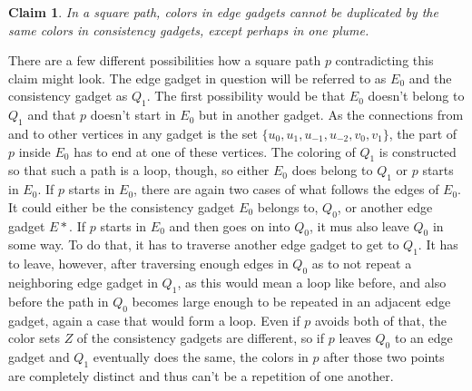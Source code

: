 \documentclass[12pt,a4paper]{article}
\newtheorem{claim}{Claim}
\begin{document}
\begin{claim}
In a square path, colors in edge gadgets cannot be duplicated by the same colors in consistency gadgets, except perhaps in one plume.
\end{claim} 

There are a few different possibilities how a square path $p$ contradicting this claim might look. The edge gadget in question will be referred to as $E_0$ and the consistency gadget as $Q_1$. 
\newline
The first possibility would be that $E_0$ doesn't belong to $Q_1$ and that $p$ doesn't start in $E_0$ but in another gadget. As the connections from and to other vertices in any gadget is the set $ \{u_0, u_1, u_{-1}, u_{-2}, v_0, v_1 \}$, the part of $p$ inside $E_0$ has to end at one of these vertices. The coloring of $Q_1$ is constructed so that such a path is a loop, though, so either $E_0$ does belong to $Q_1$ or $p$ starts in $E_0$.
\newline
If $p$ starts in $E_0$, there are again two cases of what follows the edges of $E_0$. It could either be the consistency gadget $E_0$ belongs to, $Q_0$, or another edge gadget $E*$.
\newline
If $p$ starts in $E_0$ and then goes on into $Q_0$, it mus also leave $Q_0$ in some way. To do that, it has to traverse another edge gadget to get to $Q_1$. It has to leave, however, after traversing enough edges in $Q_0$ as to not repeat a neighboring edge gadget in $Q_1$, as this would mean a loop like before, and also before the path in $Q_0$ becomes large enough to be repeated in an adjacent edge gadget, again a case that would form a loop. Even if $p$ avoids both of that, the color sets $Z$ of the consistency gadgets are different, so if $p$ leaves $Q_0$ to an edge gadget and $Q_1$ eventually does the same, the colors in $p$ after those two points are completely distinct and thus can't be a repetition of one another.
\newline
\end{document}
